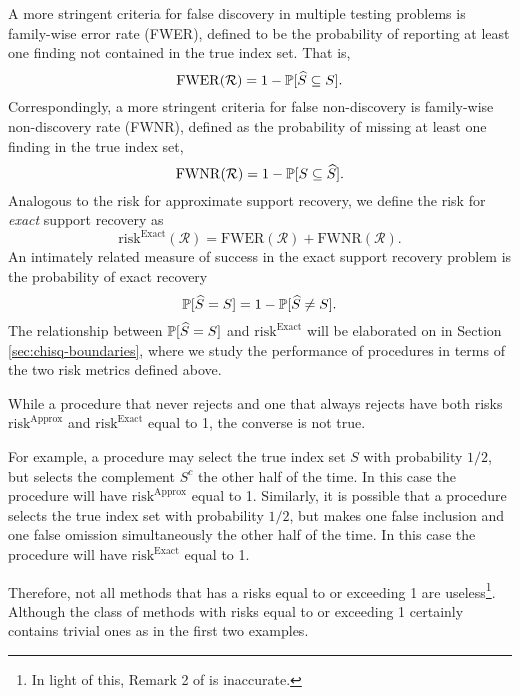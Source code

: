 A more stringent criteria for false discovery in multiple testing problems is family-wise error rate (FWER), defined to be the probability of reporting at least one finding not contained in the true index set.
That is,
\begin{equation} \label{eq:FWER}
    \mathrm{FWER}(\mathcal{R}) = 1 - \P[\widehat{S} \subseteq S].
\end{equation}
Correspondingly, a more stringent criteria for false non-discovery is family-wise non-discovery rate (FWNR), defined as the probability of missing at least one finding in the true index set,
\begin{equation} \label{eq:FWNDR}
    \mathrm{FWNR}(\mathcal{R}) = 1 - \P[S \subseteq \widehat{S}].
\end{equation}
Analogous to the risk for approximate support recovery, we define the risk for \emph{exact} support recovery as
\begin{equation} \label{eq:risk-exact}
    \mathrm{risk}^{\mathrm{Exact}}(\mathcal{R}) = \mathrm{FWER}(\mathcal{R}) + \mathrm{FWNR}(\mathcal{R}).
\end{equation}
An intimately related measure of success in the exact support recovery problem is the probability of exact recovery 
\begin{equation} \label{eq:risk-prob}
    \P[\widehat{S} = S] = 1 - \P[\widehat{S} \neq S].
\end{equation}
The relationship between $\P[\widehat{S} = S]$ and $\mathrm{risk}^{\mathrm{Exact}}$ will be elaborated on in Section \ref{sec:chisq-boundaries}, where we study the performance of procedures in terms of the two risk metrics defined above.
\begin{remark} \label{rmk:asymptotic-risks}
While a procedure that never rejects and one that always rejects have both risks $\mathrm{risk}^{\mathrm{Approx}}$ and $\mathrm{risk}^{\mathrm{Exact}}$ equal to 1, the converse is not true.

For example, a procedure may select the true index set $S$ with probability $1/2$, but selects the complement $S^c$ the other half of the time. 
In this case the procedure will have $\mathrm{risk}^{\mathrm{Approx}}$ equal to 1.
Similarly, it is possible that a procedure selects the true index set with probability $1/2$, but makes one false inclusion and one false omission simultaneously the other half of the time. 
In this case the procedure will have $\mathrm{risk}^{\mathrm{Exact}}$ equal to 1.
 
Therefore, not all methods that has a risks equal to or exceeding 1 are useless\footnote{In light of this, Remark 2 of \citet*{arias2017distribution} is inaccurate.}.
Although the class of methods with risks equal to or exceeding 1 certainly contains trivial ones as in the first two examples.
\end{remark}

